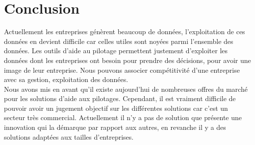 \section{Conclusion}

Actuellement les entreprises génèrent beaucoup de données, l'exploitation de ces données en devient difficile car celles utiles sont noyées parmi l'ensemble des données. Les outils d'aide au pilotage permettent justement d'exploiter les données dont les entreprises ont besoin pour prendre des décisions, pour avoir une image de leur entreprise. Nous pouvons associer compétitivité d'une entreprise avec sa gestion, exploitation des données. \\
Nous avons mis en avant qu'il existe aujourd'hui de nombreuses offres du marché pour les solutions d'aide aux pilotages. Cependant, il est vraiment difficile de pouvoir avoir un jugement objectif sur les différentes solutions car c'est un secteur très commercial. Actuellement il n'y a pas de solution que présente une innovation qui la démarque par rapport aux autres, en revanche il y a des solutions adaptées aux tailles d'entreprises.\\
  